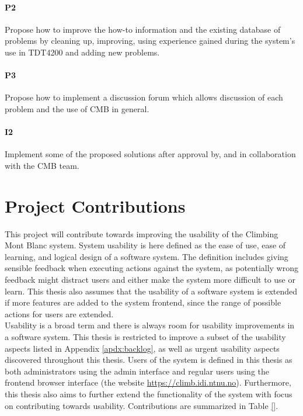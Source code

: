 \paragraph*{P2}  Propose how to improve the how-to information and the existing database of problems by cleaning up, improving, using experience gained during the system's use in TDT4200 \cite{TDT4200} and adding new problems.

\paragraph*{P3} Propose how to implement a discussion forum which allows discussion of each problem and the use of CMB in general.

\paragraph*{I2} Implement some of the proposed solutions after approval by, and in collaboration with the CMB team. \\

\section{Project Contributions}
\label{sec:cont}
This project will contribute towards improving the usability of the Climbing Mont Blanc system. System usability is here defined as the ease of use, ease of learning, and logical design of a software system. The definition includes giving sensible feedback when executing actions against the system, as potentially wrong feedback might distract users and either make the system more difficult to use or learn. This thesis also assumes that the usability of a software system is extended if more features are added to the system frontend, since the range of possible actions for users are extended. \\

Usability is a broad term and there is always room for usability improvements in a software system. This thesis is restricted to improve a subset of the usability aspects listed in Appendix \ref{apdx:backlog}, as well as urgent usability aspects discovered throughout this thesis. Users of the system is defined in this thesis as both administrators using the admin interface and regular users using the frontend browser interface (the website \url{https://climb.idi.ntnu.no}). Furthermore, this thesis also aims to further extend the functionality of the system with focus on contributing towards usability. Contributions are summarized in Table \ref{}.

